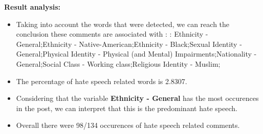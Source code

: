 \documentclass[11pt]{article}
\begin{document}
\textbf{\Large Result analysis:}

\begin{itemize}\item Taking into account the words that were detected, we can reach the conclusion these comments are associated with : : Ethnicity - General;Ethnicity - Native-American;Ethnicity - Black;Sexual Identity - General;Physical Identity - Physical (and Mental) Impairments;Nationality - General;Social Class - Working class;Religious Identity - Muslim;%

\item The percentage of hate speech related words is 2.8307.

\item Considering that the variable \textbf{Ethnicity - General} has the most occurences in the post, we can interpret that this is the predominant hate speech.

\item Overall there were 98/134 occurences of hate speech related comments.\end{itemize}
\end{document}
